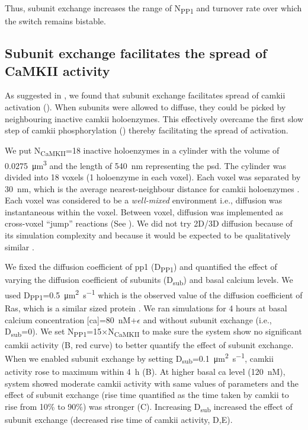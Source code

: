\documentclass[9pt,lineno]{elife}
\newcommand\SUB[2]{#1\textsubscript{#2}}
\begin{document}
Thus, subunit exchange increases the range of \SUB{N}{PP1} and turnover rate 
over which the switch remains bistable. 

\subsection{Subunit exchange facilitates the spread of CaMKII activity}
\label{res:spread_activity}

As suggested in \citep{stratton_activation-triggered_2014}, we found that
subunit exchange facilitates spread of \gls{camkii} activation
(). When subunits were allowed to diffuse, they
could be picked by neighbouring inactive \gls{camkii} holoenzymes.  This
effectively overcame the first slow step of \gls{camkii} phosphorylation
() thereby facilitating the spread of activation.

We put \SUB{N}{CaMKII}=18 inactive holoenzymes in a cylinder with the volume of
\SI{0.0275}{\cubic\micro\meter} and the length of \SI{540}{\nano\meter}
representing the \gls{psd}. The cylinder was divided into 18 voxels (1
holoenzyme in each voxel). Each voxel was separated by \SI{30}{\nano\meter},
which is the average nearest-neighbour distance for \gls{camkii} holoenzymes
\citep{feng_quantitative_2011}.  Each voxel was considered to be a
\emph{well-mixed} environment i.e., diffusion was instantaneous within the
voxel. Between voxel, diffusion was implemented as cross-voxel ``jump''
reactions (See ).  We did not try 2D/3D
diffusion because of its simulation complexity and because it would be expected
to be qualitatively similar \citep{fange_stochastic_2010}.

We fixed the diffusion coefficient of \gls{pp1} (\SUB{D}{PP1}) and quantified
the effect of varying the diffusion coefficient of subunits (\SUB{D}{sub}) and
basal calcium levels. We used
\SUB{D}{PP1}=\SI{0.5}{\micro\meter\squared\per\second} which is the observed
value of the diffusion coefficient of Ras, which is a similar sized protein
\citep{harvey_spread_2008}. We ran simulations for 4 hours at basal calcium
concentration [\gls{ca}]=\SI{80}{\nano M}+$\epsilon$ and without subunit exchange (i.e.,
\SUB{D}{sub}=0). We set \SUB{N}{PP1}=15$\times$\SUB{N}{CaMKII} to make sure the
system show no significant \gls{camkii} activity (B, red
curve) to better quantify the effect of subunit exchange. When we enabled
subunit exchange by setting
\SUB{D}{sub}=\SI{0.1}{\micro\meter\squared\per\second}, \gls{camkii} activity
rose to maximum within \SI{4}{\hour} (B). At
higher basal \gls{ca} level (\SI{120}{\nano M}), system showed moderate
\gls{camkii} activity with same values of parameters and the effect of subunit
exchange (rise time quantified as the time taken by \gls{camkii} to rise from
10\% to 90\%) was stronger (C). Increasing
\SUB{D}{sub} increased the effect of subunit exchange (decreased rise time of
\gls{camkii} activity, D,E).
\end{document}
